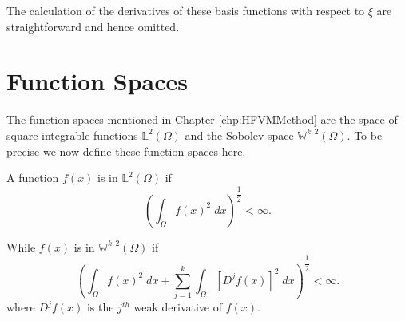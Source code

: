 The calculation of the derivatives of these basis functions with respect to $\xi$ are straightforward and hence omitted. 

\section{Function Spaces}
The function spaces mentioned in Chapter \ref{chp:HFVMMethod} are the space of square integrable functions $\mathbb{L}^2(\Omega)$ and the Sobolev space $\mathbb{W}^{k,2}(\Omega)$. To be precise we now define these function spaces here. 

A function $f(x)$ is in $\mathbb{L}^2(\Omega)$ if
\begin{equation*}
\left( \int_{\Omega} f(x)^2 \; dx \right)^{\dfrac{1}{2}} < \infty.
\end{equation*}

While $f(x)$ is in $\mathbb{W}^{k,2}(\Omega)$ if 
\begin{equation*}
\left( \int_{\Omega} f(x)^2 \; dx + \sum^k_{j=1}  \int_{\Omega} \left[D^j f(x) \right]^2 \; dx  \right)^{\dfrac{1}{2}} < \infty.
\end{equation*}
where $D^j f(x)$ is the $j^{th}$ weak derivative of $f(x)$. 

